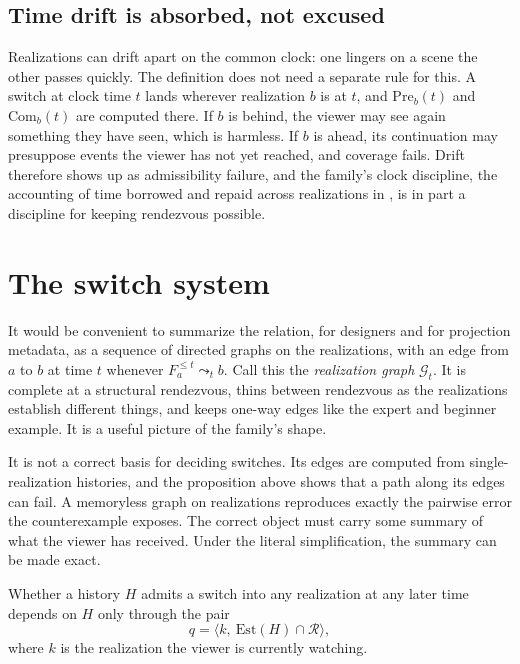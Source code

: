 \subsection*{Time drift is absorbed, not excused}

Realizations can drift apart on the common clock: one lingers on a scene the other passes quickly. The definition does not need a separate rule for this. A switch at clock time $t$ lands wherever realization $b$ is at $t$, and $\mathrm{Pre}_b(t)$ and $\mathrm{Com}_b(t)$ are computed there. If $b$ is behind, the viewer may see again something they have seen, which is harmless. If $b$ is ahead, its continuation may presuppose events the viewer has not yet reached, and coverage fails. Drift therefore shows up as admissibility failure, and the family's clock discipline, the accounting of time borrowed and repaid across realizations in , is in part a discipline for keeping rendezvous possible.

\section{The switch system}

It would be convenient to summarize the relation, for designers and for projection metadata, as a sequence of directed graphs on the realizations, with an edge from $a$ to $b$ at time $t$ whenever $F_a^{\le t}\leadsto_t b$. Call this the \emph{realization graph} $\mathcal G_t$. It is complete at a structural rendezvous, thins between rendezvous as the realizations establish different things, and keeps one-way edges like the expert and beginner example. It is a useful picture of the family's shape.

It is not a correct basis for deciding switches. Its edges are computed from single-realization histories, and the proposition above shows that a path along its edges can fail. A memoryless graph on realizations reproduces exactly the pairwise error the counterexample exposes. The correct object must carry some summary of what the viewer has received. Under the literal simplification, the summary can be made exact.

\begin{proposition}
Whether a history $H$ admits a switch into any realization at any later time depends on $H$ only through the pair
\begin{equation}
q=\big\langle k,\ \mathrm{Est}(H)\cap\mathcal R\big\rangle,
\end{equation}
where $k$ is the realization the viewer is currently watching.
\end{proposition}

